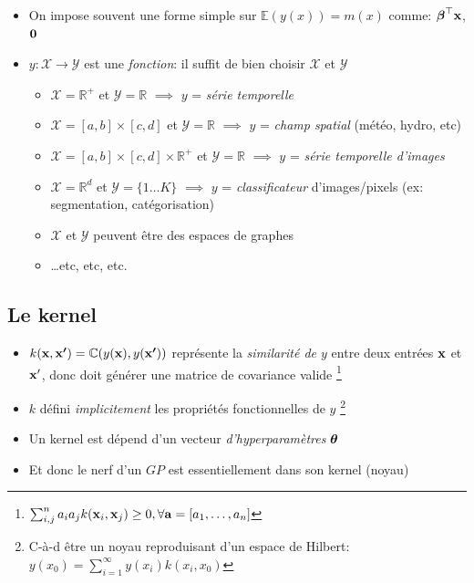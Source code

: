 \documentclass[xcolor=svgnames, t]{beamer}
\newcommand{\vectorx}[1]{\boldsymbol{\MakeLowercase{\mathbf{#1}}}}
\newcommand{\coloredemph}[1]{\textcolor{internationalblue}{\emph{#1}}}
\begin{document}
\begin{frame}{\subsecname}
  
  \begin{itemize}
    \item On impose souvent une forme simple sur $\mathbb{E}(y(x)) = m(x)$ 
    comme: $\vectorx{\beta}^\top \vectorx{x}$, $\vectorx{0}$
    \pause
    \item $y: \mathcal{X} \to \mathcal{Y}$ est une \coloredemph{fonction}: il suffit de bien choisir $\mathcal{X}$ et $\mathcal{Y}$
    \begin{itemize}
      \item $\mathcal{X} = \mathbb{R}^{+}$ et $\mathcal{Y} = \mathbb{R}$ $\implies$
      $y$ = \coloredemph{série temporelle}
      \pause
      \item $\mathcal{X} = [a, b] \times [c, d]$ et  $\mathcal{Y} = \mathbb{R}$ $\implies$
      $y$ = \coloredemph{champ spatial} (météo, hydro, etc)
      \pause
      \item $\mathcal{X} = [a, b] \times [c, d] \times \mathbb{R}^{+}$ et $\mathcal{Y} = \mathbb{R}$ $\implies$
      $y$ = \coloredemph{série temporelle d'images}
      \pause
      \item $\mathcal{X} = \mathbb{R}^{d}$ et $\mathcal{Y} = \{1 \dots K \}$ $\implies$
      $y$ = \coloredemph{classificateur} d'images/pixels (ex: segmentation, catégorisation)
      \item $\mathcal{X}$ et $\mathcal{Y}$ peuvent être des espaces de graphes
      \item \dots etc, etc, etc.
    \end{itemize}
  \end{itemize}
\end{frame}

\subsection{Le kernel}
\begin{frame}{\subsecname}
  
  \begin{itemize}
    \item $k(\vectorx{x}, \vectorx{x^{\prime}}) = \mathbb{C}( y(\vectorx{x}), y(\vectorx{x^\prime}) )$
     représente la \coloredemph{similarité de $y$} entre deux entrées $\vectorx{x}$ et $\vectorx{x}^\prime$,
     donc doit générer une matrice de covariance valide
     \footnote{
      $\sum_{i,j}^{n} a_i a_j k(\vectorx{x}_i, \vectorx{x}_j) \geq 0, \forall \vectorx{a} = [a_1, \dots, a_n]$
    }
    \pause
    \item $k$ défini \coloredemph{implicitement} les propriétés fonctionnelles de $y$
    \footnote{
      C-à-d être un noyau reproduisant d'un espace de Hilbert:
      $y(x_0) = \sum_{i=1}^{\infty} y(x_i) k(x_i, x_0)$ 
    }
    \pause
    \item Un kernel est dépend d'un vecteur \coloredemph{d'hyperparamètres} $\vectorx{\theta}$
    \pause
    \item Et donc le nerf d'un $GP$ est essentiellement dans son kernel (noyau)
  \end{itemize}
\end{frame}
\end{document}
